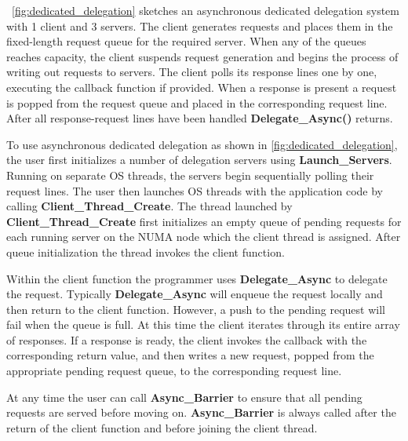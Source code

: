 \documentclass{uicthesi}
\begin{document}
~\ref{fig:dedicated_delegation} sketches an asynchronous dedicated delegation system with 1 client and 3 servers. The client generates requests and places them in the fixed-length request queue for the required server. When any of the queues reaches capacity, the client suspends request generation and begins the process of writing out requests to servers. The client polls its response lines one by one, executing the callback function if provided. When a response is present a request is popped from the request queue and placed in the corresponding request line. After all response-request lines have been handled \textbf{Delegate\_Async()} returns. 

To use asynchronous dedicated delegation as shown in \ref{fig:dedicated_delegation}, the user first initializes a number of delegation servers using \textbf{Launch\_Servers}. Running on separate OS threads, the servers begin sequentially polling their request lines. The user then launches OS threads with the application code by calling \textbf{Client\_Thread\_Create}. The thread launched by \textbf{Client\_Thread\_Create} first initializes an empty queue of pending requests for each running server on the NUMA node which the client thread is assigned. After queue initialization the thread invokes the client function. 

Within the client function the programmer uses \textbf{Delegate\_Async} to delegate the request. Typically \textbf{Delegate\_Async} will enqueue the request locally and then return to the client function. However, a push to the pending request will fail when the queue is full. At this time the client iterates through its entire array of responses. If a response is ready, the client invokes the callback with the corresponding return value, and then writes a new request, popped from the appropriate pending request queue, to the corresponding request line. 

At any time the user can call \textbf{Async\_Barrier} to ensure that all pending requests are served before moving on.  \textbf{Async\_Barrier} is always called after the return of the client function and before joining the client thread. 
\end{document}
